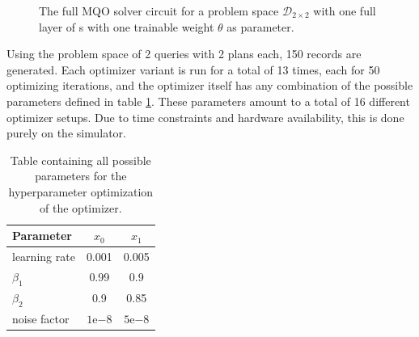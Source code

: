 \begin{figure}[!h]
    \centering
    \caption{The full MQO solver circuit for a problem space $\mathcal{D}_{2\times2}$ with one full layer of \rxgate s with one trainable weight $\theta$ as parameter.}
    \label{circuit:full_trainable_mqp_circuit_1_w}
\end{figure}


Using the problem space of 2 queries with 2 plans each, 150 records are generated. Each optimizer variant is run for a total of 13 times, each for 50 optimizing iterations, and the optimizer itself has any combination of the possible parameters defined in table \ref{table:hyperparameter_options}. These parameters amount to a total of 16 different optimizer setups. Due to time constraints and hardware availability, this is done purely on the simulator.

\begin{table}[!h]
    \centering
    \begin{tabular}{|l|c|c|}
    \hline
    Parameter     & $x_0$             & $x_1$             \\ \hline
    learning rate & 0.001             & 0.005             \\ \hline
    $\beta_1$     & 0.99              & 0.9               \\ \hline
    $\beta_2$     & 0.9               & 0.85              \\ \hline
    noise factor  & $1\mathrm{e}{-8}$ & $5\mathrm{e}{-8}$ \\ \hline
    \end{tabular}
    \caption{Table containing all possible parameters for the hyperparameter optimization of the  optimizer.}
    \label{table:hyperparameter_options}
\end{table}

